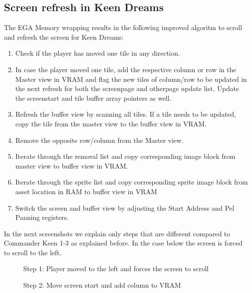 \documentclass[book.tex]{subfiles}
\begin{document}
\subsection{Screen refresh in Keen Dreams}

The EGA Memory wrapping results in the following improved algoritm to scroll and refresh the screen for Keen Dreams:
\begin{enumerate}
\item Check if the player has moved one tile in any direction.
\item In case the player moved one tile, add the respective column or row in the Master view in VRAM and flag the new tiles of column/row to be updated in the next refresh for both the screenpage and otherpage update list. Update the screenstart and tile buffer array pointers as well.
\item Refresh the buffer view by scanning all tiles. If a tile needs to be updated, copy the tile from the master view to the buffer view in VRAM.
\item Remove the opposite row/column from the Master view.
\item Iterate through the removal list and copy corresponding image block from master view to buffer view in VRAM. 
\item Iterate through the sprite list and copy corresponding sprite image block from asset location in RAM to buffer view in VRAM
\item Switch the screen and buffer view by adjusting the Start Address and Pel Panning registers.
\end{enumerate}


In the next screenshots we explain only steps that are different compared to Commander Keen 1-3 as explained before. In the case below the screen is forced to scroll to the left.
\\

\begin{figure}[H]
\centering
 \caption{Step 1: Player moved to the left and forces the screen to scroll}
 \label{fig:kc4_6_start}
\end{figure}

\begin{figure}[H]
\centering
 \caption{Step 2: Move screen start and add column to VRAM}
 \label{fig:kc4_6_add_column}
\end{figure}
\end{document}
